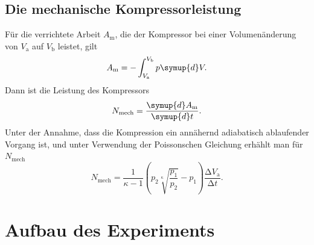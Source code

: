 \documentclass{scrartcl} %
\begin{document}
  \subsection{Die mechanische Kompressorleistung}
  Für die verrichtete Arbeit $A_\text{m}$, die der Kompressor bei einer Volumenänderung von $V_\text{a}$ auf $V_\text{b}$ leistet, gilt
  \begin{equation}
    A_\text{m} = -\int_{V_\text{a}}^{V_\text{b}} p \symup{d}V.
  \label{eqn:arbeitkompressor}
  \end{equation}
  Dann ist die Leistung des Kompressors
  \begin{equation}
    N_\text{mech} = \frac{\symup{d} A_\text{m}}{\symup{d} t}.
    \label{eqn:leistungkompressor1}
  \end{equation}
  Unter der Annahme, dass die Kompression ein annähernd adiabatisch ablaufender Vorgang ist, und unter Verwendung der Poissonschen Gleichung erhählt man für $N_\text{mech}$
  \begin{equation}
    N_\text{mech} = \frac{1}{\kappa - 1}  \left(p_\text{2} \sqrt[\kappa]{\frac{p_\text{1}}{p_\text{2}}} - p_\text{1} \right)  \frac{\increment V_\text{a}}{\increment t}.
    \label{eqn:leistungkompressor2}
  \end{equation}
\section{Aufbau des Experiments}
\end{document}
